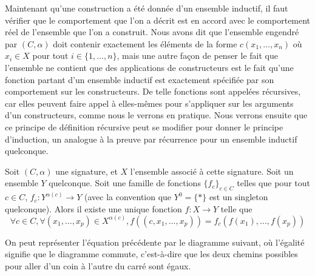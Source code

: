 Maintenant qu'une construction a été donnée d'un ensemble inductif, il faut
vérifier que le comportement que l'on a décrit est en accord avec le
comportement réel de l'ensemble que l'on a construit. Nous avons dit que
l'ensemble engendré par $(C,\alpha)$ doit contenir exactement les éléments de
la forme $c(x_1,\ldots,x_n)$ où $x_i \in X$ pour tout $i\in\{1,\ldots,n\}$, mais
une autre façon de penser le fait que l'ensemble ne contient que des
applications de constructeurs est le fait qu'une fonction partant d'un ensemble
inductif est exactement spécifiée par son comportement sur les constructeurs.
De telle fonctions sont appelées récursives, car elles peuvent faire appel à
elles-mêmes pour s'appliquer sur les arguments d'un constructeurs, comme nous le
verrons en pratique. Nous verrons ensuite que ce principe de définition
récursive peut se modifier pour donner le principe d'induction, un analogue à
la preuve par récurrence pour un ensemble inductif quelconque.

\begin{theorem}
  Soit $(C,\alpha)$ une signature, et $X$ l'ensemble associé à cette signature.
  Soit un ensemble $Y$ quelconque.
  Soit une famille de fonctions $\{f_c\}_{c\in C}$ telles que pour tout $c\in C$,
  $f_c : Y^{\alpha(c)} \to Y$ (avec la convention que $Y^0 = \{*\}$ est un
  singleton quelconque). Alors il existe une unique fonction $f : X \to Y$
  telle que
  $$\forall c\in C, \forall (x_1,\ldots,x_p)\in X^{\alpha(c)},
  f((c,x_1,\ldots,x_p)) = f_c (f(x_1),\ldots,f(x_p))$$
\end{theorem}

On peut représenter l'équation précédente par le diagramme suivant, où l'égalité
signifie que le diagramme commute, c'est-à-dire que les deux chemins possibles
pour aller d'un coin à l'autre du carré sont égaux.

\begin{center}
\end{center}

